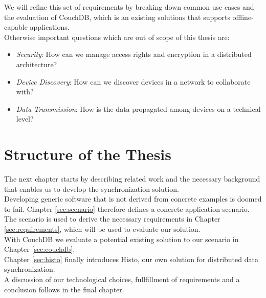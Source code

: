We will refine this set of requirements by breaking down common use cases and the evaluation of CouchDB, which is an existing solutions that supports offline-capable applications.\\

Otherwise important questions which are out of scope of this thesis are:

\begin{itemize}
\item \emph{Security}: How can we manage access rights and encryption in a distributed architecture?
\item \emph{Device Discovery}: How can we discover devices in a network to collaborate with?
\item \emph{Data Transmission}: How is the data propagated among devices on a technical level?
\end{itemize}

\section{Structure of the Thesis}
The next chapter starts by describing related work and the necessary background that enables us to develop the synchronization solution.\\
Developing generic software that is not derived from concrete examples is doomed to fail.
Chapter \ref{sec:scenario} therefore defines a concrete application scenario.\\
The scenario is used to derive the necessary requirements in Chapter \ref{sec:requirements}, which will be used to evaluate our solution.\\
With CouchDB we evaluate a potential existing solution to our scenario in Chapter \ref{sec:couchdb}.\\
Chapter \ref{sec:histo} finally introduces Histo, our own solution for distributed data synchronization.\\
A discussion of our technological choices, fullfillment of requirements and a conclusion follows in the final chapter.
